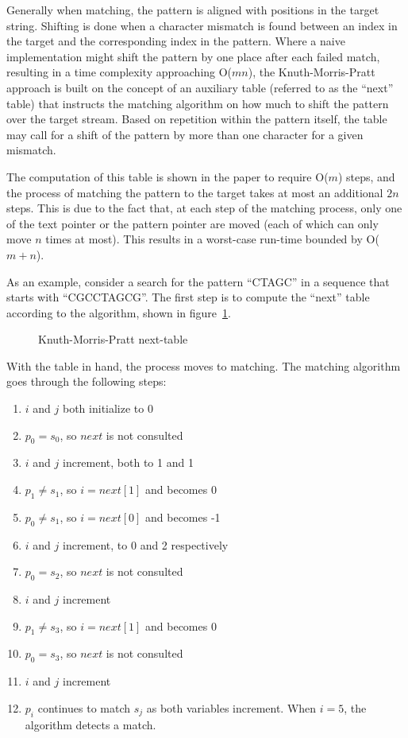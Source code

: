 Generally when matching, the pattern is aligned with positions in the target string. Shifting is done when a character mismatch is found between an index in the target and the corresponding index in the pattern. Where a naive implementation might shift the pattern by one place after each failed match, resulting in a time complexity approaching O($mn$), the Knuth-Morris-Pratt approach is built on the concept of an auxiliary table (referred to as the ``next'' table) that instructs the matching algorithm on how much to shift the pattern over the target stream. Based on repetition within the pattern itself, the table may call for a shift of the pattern by more than one character for a given mismatch.

The computation of this table is shown in the paper to require O($m$) steps, and the process of matching the pattern to the target takes at most an additional $2n$ steps. This is due to the fact that, at each step of the matching process, only one of the text pointer or the pattern pointer are moved (each of which can only move $n$ times at most). This results in a worst-case run-time bounded by O($m+n$).

As an example, consider a search for the pattern ``CTAGC'' in a sequence that starts with ``CGCCTAGCG''. The first step is to compute the ``next'' table according to the algorithm, shown in figure~\ref{fig:kmp_next}.

\begin{figure}[ht]
\centering

\caption{Knuth-Morris-Pratt next-table}
\label{fig:kmp_next}
\end{figure}

With the table in hand, the process moves to matching. The matching algorithm goes through the following steps:

\begin{enumerate}
\item $i$ and $j$ both initialize to 0
\item $p_0 = s_0$, so $next$ is not consulted
\item $i$ and $j$ increment, both to 1 and 1
\item $p_1 \neq s_1$, so $i = next[1]$ and becomes 0
\item $p_0 \neq s_1$, so $i = next[0]$ and becomes -1
\item $i$ and $j$ increment, to 0 and 2 respectively
\item $p_0 = s_2$, so $next$ is not consulted
\item $i$ and $j$ increment
\item $p_1 \neq s_3$, so $i = next[1]$ and becomes 0
\item $p_0 = s_3$, so $next$ is not consulted
\item $i$ and $j$ increment
\item $p_i$ continues to match $s_j$ as both variables increment. When $i = 5$, the algorithm detects a match.
\end{enumerate}

